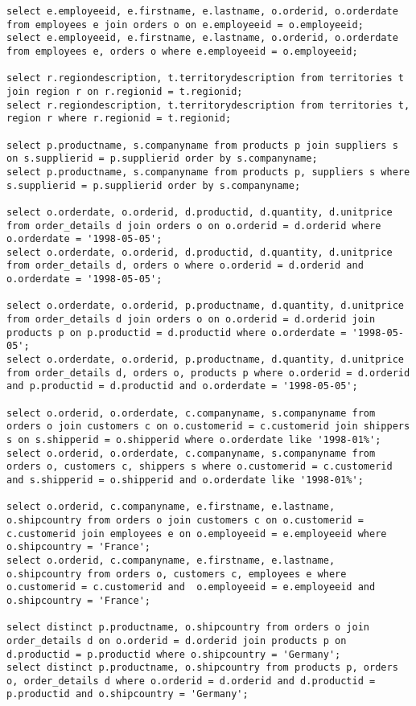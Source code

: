 \documentclass{article}
\begin{document}
        \begin{lstlisting}
select e.employeeid, e.firstname, e.lastname, o.orderid, o.orderdate from employees e join orders o on e.employeeid = o.employeeid;
select e.employeeid, e.firstname, e.lastname, o.orderid, o.orderdate from employees e, orders o where e.employeeid = o.employeeid;

select r.regiondescription, t.territorydescription from territories t join region r on r.regionid = t.regionid;
select r.regiondescription, t.territorydescription from territories t, region r where r.regionid = t.regionid;

select p.productname, s.companyname from products p join suppliers s on s.supplierid = p.supplierid order by s.companyname;
select p.productname, s.companyname from products p, suppliers s where s.supplierid = p.supplierid order by s.companyname;

select o.orderdate, o.orderid, d.productid, d.quantity, d.unitprice from order_details d join orders o on o.orderid = d.orderid where o.orderdate = '1998-05-05';
select o.orderdate, o.orderid, d.productid, d.quantity, d.unitprice from order_details d, orders o where o.orderid = d.orderid and o.orderdate = '1998-05-05';

select o.orderdate, o.orderid, p.productname, d.quantity, d.unitprice from order_details d join orders o on o.orderid = d.orderid join products p on p.productid = d.productid where o.orderdate = '1998-05-05';
select o.orderdate, o.orderid, p.productname, d.quantity, d.unitprice from order_details d, orders o, products p where o.orderid = d.orderid and p.productid = d.productid and o.orderdate = '1998-05-05';

select o.orderid, o.orderdate, c.companyname, s.companyname from orders o join customers c on o.customerid = c.customerid join shippers s on s.shipperid = o.shipperid where o.orderdate like '1998-01%';
select o.orderid, o.orderdate, c.companyname, s.companyname from orders o, customers c, shippers s where o.customerid = c.customerid and s.shipperid = o.shipperid and o.orderdate like '1998-01%';

select o.orderid, c.companyname, e.firstname, e.lastname, o.shipcountry from orders o join customers c on o.customerid = c.customerid join employees e on o.employeeid = e.employeeid where o.shipcountry = 'France';
select o.orderid, c.companyname, e.firstname, e.lastname, o.shipcountry from orders o, customers c, employees e where o.customerid = c.customerid and  o.employeeid = e.employeeid and o.shipcountry = 'France';

select distinct p.productname, o.shipcountry from orders o join order_details d on o.orderid = d.orderid join products p on  d.productid = p.productid where o.shipcountry = 'Germany'; 
select distinct p.productname, o.shipcountry from products p, orders o, order_details d where o.orderid = d.orderid and d.productid = p.productid and o.shipcountry = 'Germany'; 
        \end{lstlisting}
\end{document}
